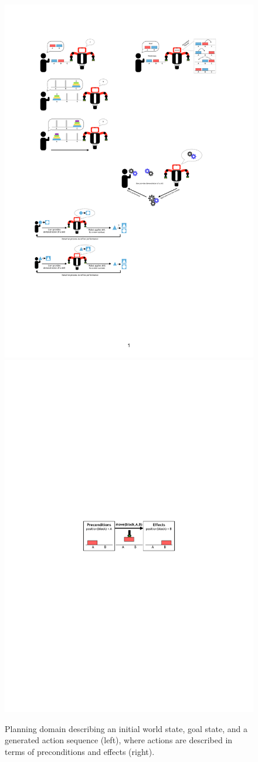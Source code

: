 \begin{figure}[htp]
	\centering
	\includegraphics[width=.55\linewidth]{figures/PbD-AutomatedPlanner}
	\includegraphics[width=.4\linewidth]{figures/schema-logic-1}
	\caption{Planning domain describing an initial world state, goal state, and a generated action sequence (left), where actions are described in terms of preconditions and effects (right).}
	\label{fig:Planning domain and action}
\end{figure}
